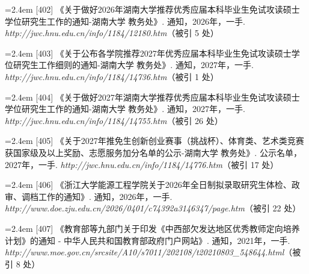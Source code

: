 {\noindent\hangindent=2.4em \label{src:S0537}{\color{cAccent}[402]} 《关于做好2026年湖南大学推荐优秀应届本科毕业生免试攻读硕士学位研究生工作的通知-湖南大学 教务处》. 通知，2026年，一手. \textit{http://jwc.hnu.edu.cn/info/1184/12180.htm}（被引 5 处）\par
\vspace{0.6pt}
\noindent\hangindent=2.4em \label{src:S0539}{\color{cAccent}[403]} 《关于公布各学院推荐2027年优秀应届本科毕业生免试攻读硕士学位研究生工作细则的通知-湖南大学 教务处》. 通知，2027年，一手. \textit{http://jwc.hnu.edu.cn/info/1184/14736.htm}（被引 1 处）\par
\vspace{0.6pt}
\noindent\hangindent=2.4em \label{src:S0540}{\color{cAccent}[404]} 《关于做好2027年湖南大学推荐优秀应届本科毕业生免试攻读硕士学位研究生工作的通知-湖南大学 教务处》. 通知，2027年，一手. \textit{http://jwc.hnu.edu.cn/info/1184/14755.htm}（被引 26 处）\par
\vspace{0.6pt}
\noindent\hangindent=2.4em \label{src:S0541}{\color{cAccent}[405]} 《关于2027年推免生创新创业赛事（挑战杯）、体育类、艺术类竞赛获国家级及以上奖励、志愿服务加分名单的公示-湖南大学 教务处》. 公示名单，2027年，一手. \textit{http://jwc.hnu.edu.cn/info/1184/14776.htm}（被引 17 处）\par
\vspace{0.6pt}
\vspace{3.5pt}\par
\nopagebreak\vspace{1pt}
\noindent\hangindent=2.4em \label{src:S0542}{\color{cAccent}[406]} 《浙江大学能源工程学院关于2026年全日制拟录取研究生体检、政审、调档工作的通知》. 通知，2026年，一手. \textit{http://www.doe.zju.edu.cn/2026/0401/c74392a3146347/page.htm}（被引 22 处）\par
\vspace{0.6pt}
\vspace{3.5pt}\par
\nopagebreak\vspace{1pt}
\noindent\hangindent=2.4em \label{src:S0543}{\color{cAccent}[407]} 《教育部等九部门关于印发《中西部欠发达地区优秀教师定向培养计划》的通知 - 中华人民共和国教育部政府门户网站》. 通知，2021年，一手. \textit{http://www.moe.gov.cn/srcsite/A10/s7011/202108/t20210803\_548644.html}（被引 8 处）\par
\vspace{0.6pt}
}
